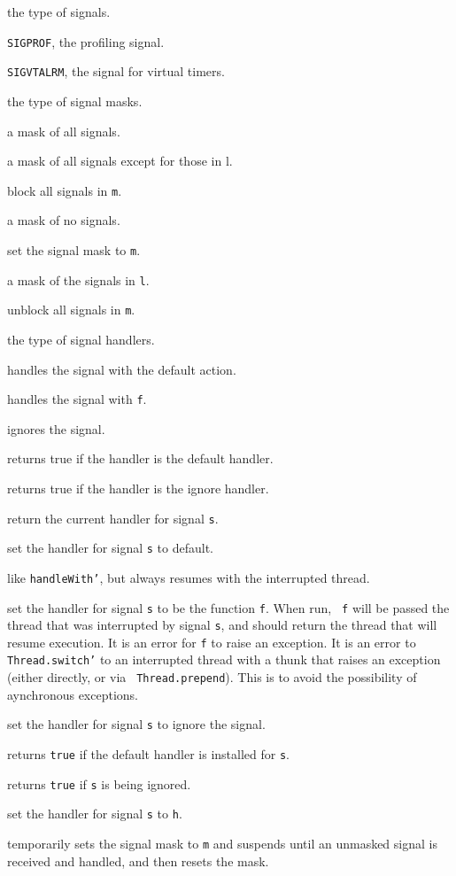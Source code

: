\begin{description}

 the type of signals.

{\tt SIGPROF}, the profiling signal.

{\tt SIGVTALRM}, the signal for virtual timers.

 the type of signal masks.

 a mask of all signals.

 a mask of all signals except for those in l.

 block all signals in {\tt m}.

 a mask of no signals.

 set the signal mask to {\tt m}.

 a mask of the signals in {\tt l}.

 unblock all signals in {\tt m}.

 the type of signal handlers.

 handles the signal with the default action.

 handles the signal with {\tt f}.

 ignores the signal.

 returns true if the handler is the default handler.

 returns true if the handler is the ignore handler.

 return the current handler for signal {\tt s}.

 set the handler for signal {\tt s} to default.

 like {\tt handleWith'}, but always resumes with the
interrupted thread.

set the handler for signal {\tt s} to be the function {\tt f}.  When run, {\tt
f} will be passed the thread that was interrupted by signal {\tt s}, and should
return the thread that will resume execution.  It is an error for {\tt f} to
raise an exception.  It is an error to {\tt Thread.switch'} to an interrupted
thread with a thunk that raises an exception (either directly, or via {\tt
Thread.prepend}).  This is to avoid the possibility of aynchronous exceptions.

 set the handler for signal {\tt s} to ignore the signal.

 returns {\tt true} if the default handler
is installed for {\tt s}.

 returns {\tt true} if {\tt s} is being ignored.

 set the handler for signal {\tt s} to {\tt h}.

temporarily sets the signal mask to {\tt m} and suspends until an
unmasked signal is received and handled, and then resets the mask.
\end{description}

